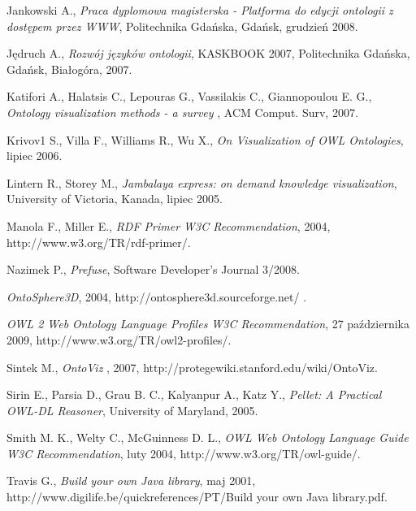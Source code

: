 \begin{thebibliography}{99}
   Jankowski A., \textit{Praca dyplomowa magisterska - Platforma do edycji ontologii z dostępem przez WWW}, Politechnika Gdańska, Gdańsk, grudzień 2008. 
 
   Jędruch A., \textit{Rozwój języków ontologii}, KASKBOOK 2007, Politechnika Gdańska, Gdańsk, Białogóra, 2007.

   Katifori A., Halatsis C., Lepouras G., Vassilakis C., Giannopoulou E. G., \textit{ Ontology visualization methods  - a survey} ,  ACM Comput. Surv, 2007.

   Krivov1 S., Villa F., Williams R., Wu X., \textit{On Visualization of OWL Ontologies}, lipiec 2006.

   Lintern R., Storey M., \textit{Jambalaya express: on demand knowledge visualization}, University of Victoria, Kanada, lipiec 2005.

   Manola F., Miller E., \textit{RDF Primer W3C Recommendation}, 2004, http://www.w3.org/TR/rdf-primer/.

   Nazimek P., \textit{Prefuse}, Software Developer's Journal 3/2008.

   \textit{OntoSphere3D}, 2004, http://ontosphere3d.sourceforge.net/ .

   \textit{OWL 2 Web Ontology Language Profiles W3C Recommendation}, 27 października 2009, http://www.w3.org/TR/owl2-profiles/.

   Sintek M., \textit{OntoViz} , 2007, http://protegewiki.stanford.edu/wiki/OntoViz.

   Sirin E., Parsia D., Grau B. C., Kalyanpur A., Katz Y., \textit{Pellet: A Practical OWL-DL Reasoner},  University of Maryland, 2005.

   Smith M. K., Welty C.,  McGuinness D. L., \textit{OWL Web Ontology Language Guide W3C Recommendation}, luty 2004, http://www.w3.org/TR/owl-guide/. 

   Travis G., \textit{Build your own Java library}, maj 2001, http://www.digilife.be/quickreferences/PT/Build your own Java library.pdf.
 


\end{thebibliography}

